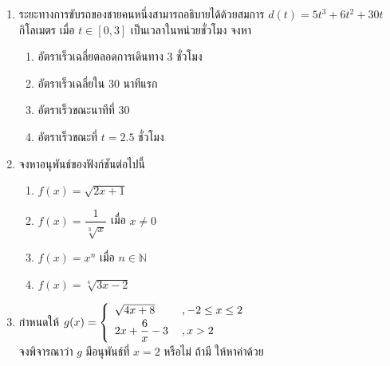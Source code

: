 \documentclass[hidelinks,12pt,a4paper]{article}
\newcommand{\s}{\space}
\newcommand{\nr}[2]{\sqrt[#1]{#2}}
\begin{document}
\begin{enumerate}
    \item ระยะทางการขับรถของชายคนหนึ่งสามารถอธิบายได้ด้วยสมการ $d(t)=5t^3+6t^2+30t$ กิโลเมตร เมื่อ $t\in [0,3]$ เป็นเวลาในหน่วยชั่วโมง จงหา
    \begin{multicols}{2}
    \begin{enumerate}
        \renewcommand{\labelenumii}{\arabic{enumii})}
        \item อัตราเร็วเฉลี่ยตลอดการเดินทาง $3$ ชั่วโมง
        \vspace{40mm}
        \item อัตราเร็วเฉลี่ยใน $30$ นาทีแรก 
        \item อัตราเร็วขณะนาทีที่ $30$ 
        \vspace{40mm}
        \item อัตราเร็วขณะที่ $t=2.5$ ชั่วโมง
    \end{enumerate}
    \end{multicols}
    \vspace{40mm}
    \item จงหาอนุพันธ์ของฟังก์ชันต่อไปนี้
    \begin{multicols}{2}
    \begin{enumerate}
        \renewcommand{\labelenumii}{\arabic{enumii})}
        \item $f(x)=\sqrt{2x+1}$
        \vspace{45mm}
        \item $f(x)=\dfrac{1}{\nr{3}{x}}$ \s เมื่อ \s $x\neq0$
        \item $f(x)=x^n$ \s เมื่อ \s $n\in \mathbb{N}$
        \vspace{45mm}
        \item $f(x)=\nr{4}{3x-2}$
    \end{enumerate}
    \end{multicols}
    \newpage
    \item กำหนดให้ 
    $g(x) = \left\{ \begin{array}{ll}
        \sqrt{4x+8} & \hspace{0.8mm} ,-2\leq x\leq2 \\[0.5ex]
        2x+\dfrac{6}{x}-3 &  \hspace{0.8mm} ,x>2
        \end{array} 
        \right.$ \\[0.8ex]
    จงพิจารณาว่า $g$ มีอนุพันธ์ที่ $x=2$ หรือไม่ ถ้ามี ให้หาค่าด้วย

\end{enumerate}
\end{document}
